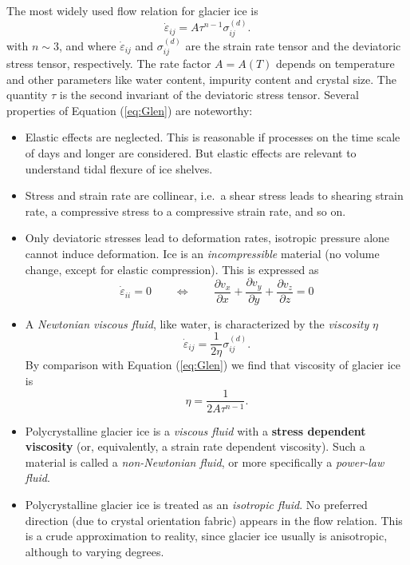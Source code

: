 \documentclass[11pt,halfparskip]{scrartcl}
\newcommand{\epsdot}{\dot{\varepsilon}}
\begin{document}
The most widely used flow relation for glacier ice is
\citep{Glen1955,Steinemann1954}
%  
\begin{equation}
  \label{eq:Glen} \epsdot_{ij} = A \tau^{n-1}\sigma^{(d)}_{ij}.
\end{equation}
%
with $n\sim 3$, and where $\epsdot_{ij}$ and $\sigma^{(d)}_{ij}$ are
the strain rate tensor and the deviatoric stress tensor, respectively.
The rate factor $A = A(T)$ depends on temperature and other parameters
like water content, impurity content and crystal size.  The quantity
$\tau$ is the second invariant of the deviatoric stress tensor.
%
Several properties of Equation (\ref{eq:Glen}) are noteworthy:
\begin{itemize}
\item Elastic effects are neglected.  This is reasonable if processes on the
  time scale of days and longer are considered. But elastic effects are relevant to understand tidal flexure of ice shelves.
\item Stress and strain rate are collinear, i.e.~a shear stress leads to
  shearing strain rate, a compressive stress to a compressive strain rate, and
  so on.
\item Only deviatoric stresses lead to deformation rates, isotropic pressure
  alone cannot induce deformation. Ice is an \emph{incompressible} material
  (no volume change, except for elastic compression).  This is expressed as
  \[
  \epsdot_{ii} = 0 \qquad \Longleftrightarrow \qquad
  \frac{\partial v_x}{\partial x} + \frac{\partial v_y}{\partial y} +
  \frac{\partial v_z}{\partial z} = 0
  \]
\item A \emph{Newtonian viscous fluid}, like water, is characterized by
  the \emph{viscosity} $\eta$
  \begin{equation}
    \label{eq:viscosity-newtonian}
  \epsdot_{ij} = \frac{1}{2\eta} \sigma^{(d)}_{ij}.
  \end{equation}
  By comparison with Equation (\ref{eq:Glen}) we find that viscosity of
  glacier ice is
  \[
  \eta=\frac{1}{2A\tau^{n-1}}.
  \]

\item Polycrystalline glacier ice is a \emph{viscous fluid} with a
  \textbf{stress dependent viscosity} (or, equivalently, a strain rate
  dependent viscosity).  Such a material is called a \emph{non-Newtonian
    fluid}, or more specifically a \emph{power-law fluid}.
\item Polycrystalline glacier ice is treated as an \emph{isotropic fluid}. No
  preferred direction (due to crystal orientation fabric) appears in the flow
  relation.  This is a crude approximation to reality, since glacier ice
  usually is anisotropic, although to varying degrees.
  
\end{itemize}
\end{document}
